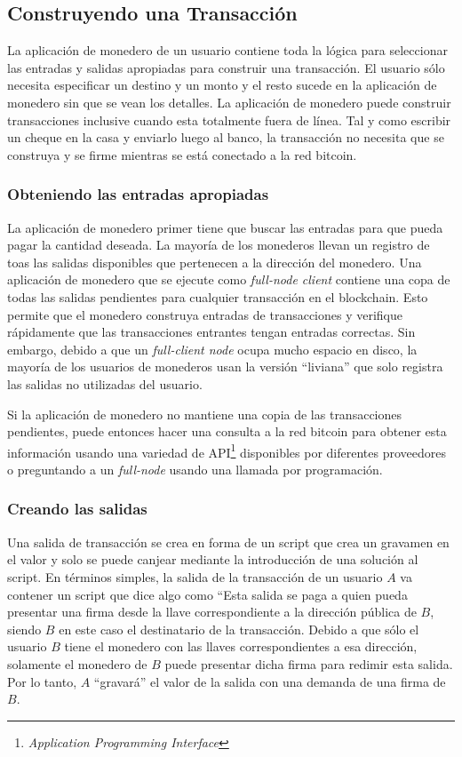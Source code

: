 \documentclass[10pt,journal,compsoc]{IEEEtran}
\begin{document}
\subsection{Construyendo una Transacción}
La aplicación de monedero de un usuario contiene toda la lógica para seleccionar las entradas y salidas apropiadas para construir una transacción. El usuario sólo necesita especificar un destino y un monto y el resto sucede en la aplicación de monedero sin que se vean los detalles. La aplicación de monedero puede construir transacciones inclusive cuando esta totalmente fuera de línea. Tal y como escribir un cheque en la casa y enviarlo luego al banco, la transacción no necesita que se construya y se firme mientras se está conectado a la red bitcoin.

\subsubsection{Obteniendo las entradas apropiadas}
La aplicación de monedero primer tiene que buscar las entradas para que pueda pagar la cantidad deseada. La mayoría de los monederos llevan un registro de toas las salidas disponibles que pertenecen a la dirección del monedero. Una aplicación de monedero que se ejecute como \emph{full-node client} contiene una copa de todas las salidas pendientes para cualquier transacción en el blockchain. Esto permite que el monedero construya entradas de transacciones y verifique rápidamente que las transacciones entrantes tengan entradas correctas. Sin embargo, debido a que un \emph{full-client node} ocupa mucho espacio en disco, la mayoría de los usuarios de monederos usan la versión ``liviana'' que solo registra las salidas no utilizadas del usuario.

Si la aplicación de monedero no mantiene una copia de las transacciones pendientes, puede entonces hacer una consulta a la red bitcoin para obtener esta información usando una variedad de API\footnote{\emph{Application Programming Interface}} disponibles por diferentes proveedores o preguntando a un \emph{full-node} usando una llamada por programación.

\subsubsection{Creando las salidas}
Una salida de transacción se crea en forma de un script que crea un gravamen en el valor y solo se puede canjear mediante la introducción de una solución al script. En términos simples, la salida de la transacción de un usuario $A$ va contener un script que dice algo como ``Esta salida se paga a quien pueda presentar una firma desde la llave correspondiente a la dirección pública de $B$, siendo $B$ en este caso el destinatario de la transacción. Debido a que sólo el usuario $B$ tiene el monedero con las llaves correspondientes a esa dirección, solamente el monedero de $B$ puede presentar dicha firma para redimir esta salida. Por lo tanto, $A$ ``gravará'' el valor de la salida con una demanda de una firma de $B$.
\end{document}
